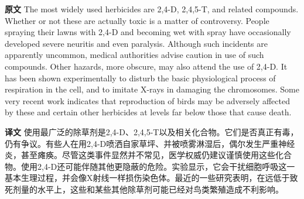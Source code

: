\documentclass[UTF8,zihao=-4]{ctexart}
\begin{document}
\noindent\textbf{原文} The most widely used herbicides are 2,4-D, 2,4,5-T, and related compounds. Whether or not these are actually toxic is a matter of controversy. People spraying their lawns with 2,4-D and becoming wet with spray have occasionally developed severe neuritis and even paralysis. Although such incidents are apparently uncommon, medical authorities advise caution in use of such compounds. Other hazards, more obscure, may also attend the use of 2,4-D. It has been shown experimentally to disturb the basic physiological process of respiration in the cell, and to imitate X-rays in damaging the chromosomes. Some very recent work indicates that reproduction of birds may be adversely affected by these and certain other herbicides at levels far below those that cause death.
\par
\noindent\textbf{译文} 使用最广泛的除草剂是2,4-D、2,4,5-T以及相关化合物。它们是否真正有毒，仍有争议。有些人在用2,4-D喷洒自家草坪、并被喷雾淋湿后，偶尔发生严重神经炎，甚至瘫痪。尽管这类事件显然并不常见，医学权威仍建议谨慎使用这些化合物。使用2,4-D还可能伴随其他更隐蔽的危险。实验显示，它会干扰细胞呼吸这一基本生理过程，并会像X射线一样损伤染色体。最近的一些研究表明，在远低于致死剂量的水平上，这些和某些其他除草剂可能已经对鸟类繁殖造成不利影响。
\par\medskip
\end{document}
